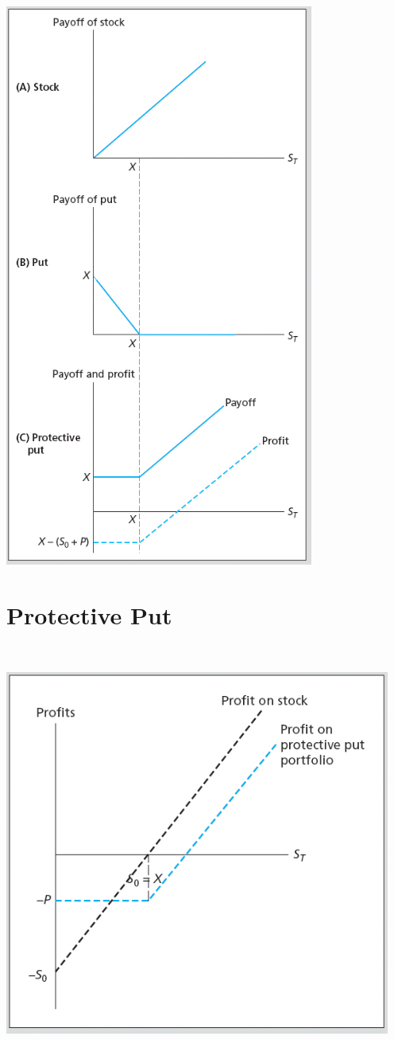 \documentclass[letterpaper,10pt,english]{sphinxmanual}
\begin{document}
\includegraphics[width=4in]{bod34698_1506_lg.jpg}


\section{Protective Put}
\label{options:id20}
$\qquad$

\includegraphics[width=5in]{bod34698_1507_lg.jpg}
\end{document}
